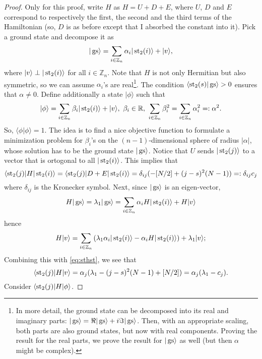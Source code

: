 \begin{proof}
Only for this proof, write $H$ as $H = U + D + E$, where $U$, $D$ and $E$ correspond to respectively the first, the second and the third terms of the Hamiltonian (so, $D$ is as before except that I absorbed the constant into it). Pick a ground state and decompose it as 
\[
|\operatorname{gs} \rangle = \sum_{i \in \mathbb Z_n} \alpha_i |\operatorname{st}_2(i)\rangle + |v\rangle,
\]
where $|v\rangle \perp |\operatorname{st}_2(i)\rangle$ for all $i \in \mathbb Z_n$. Note that $H$ is not only Hermitian but also symmetric, so we can assume $\alpha_i$'s are real\footnote{In more detail, the ground state can be decomposed into its real and imaginary parts: $|\operatorname{gs}\rangle = \Re|\operatorname{gs}\rangle + i \Im |\operatorname{gs}\rangle$. Then, with an appropriate scaling, both parts are also ground states, but now with real components. Proving the result for the real parts, we prove the result for $|\operatorname{gs}\rangle$ as well (but then $\alpha$ might be complex).}. The condition $\langle \operatorname{st}_2(s)|\operatorname{gs} \rangle > 0$ ensures that $\alpha \neq 0$. Define additionally a state $|\phi \rangle$ such that
\[
|\phi\rangle = \sum_{i \in \mathbb Z_n} \beta_i | \operatorname{st}_2(i)\rangle + |v\rangle, \ \beta_i \in \mathbb R, \ \sum_{i\in \mathbb Z_n}\beta_i^2 = \sum_{i\in \mathbb Z_n} \alpha_i^2 =: \alpha^2.
\]
So, $\langle \phi | \phi \rangle = 1$. The idea is to find a nice objective function to formulate a minimization problem for $\beta_i$'s on the $(n-1)$-dimensional sphere of radius $|\alpha|$, whose solution has to be the ground state $|\operatorname{gs}\rangle$. Notice that $U$ sends $|\operatorname{st}_2(j)\rangle$ to a vector that is ortogonal to all $|\operatorname{st}_2(i)\rangle$. This implies that
\begin{equation}\label{eq:sthst}
\langle \operatorname{st}_2(j) | H| \operatorname{st}_2(i) \rangle = \langle \operatorname{st}_2(j)|D+E|\operatorname{st}_2(i)\rangle = \delta_{ij}(-[N/2] + (j-s)^2(N-1)) =:\delta_{ij}c_j
\end{equation}
where $\delta_{ij}$ is the Kronecker symbol.  Next, since $|\operatorname{gs}\rangle$ is an eigen-vector,
\[
H|\operatorname{gs}\rangle = \lambda_1 |\operatorname{gs}\rangle = \sum_{i \in \mathbb Z_n} \alpha_i H|\operatorname{st}_2(i)\rangle + H|v\rangle
\]
hence
\[
H|v\rangle = \sum_{i \in \mathbb Z_n}\left(\lambda_1\alpha_i |\operatorname{st}_2(i)\rangle - \alpha_iH|\operatorname{st}_2(i)\rangle\right) +\lambda_1|v\rangle;
\]
Combining this with \eqref{eq:sthst}, we see that
\[
\langle \operatorname{st}_2(j) | H|v \rangle = \alpha_j(\lambda_1 - (j-s)^2(N-1) + [N/2]) = \alpha_j(\lambda_1-c_j).
\]
Consider $\langle \operatorname{st}_2(j) |H|\phi\rangle$.%

\end{proof}
